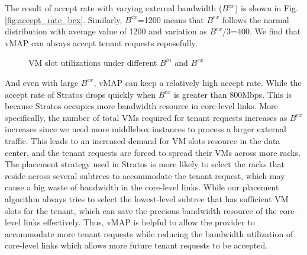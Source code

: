 \documentclass[review]{elsarticle}
\begin{document}
The result of accept rate with varying external bandwidth ($B^{ex}$) is shown in Fig. \ref{fig:accept_rate_bex}. Similarly, $B^{ex}$=1200 means that $B^{ex}$ follows the normal distribution with average value of 1200 and variation as $B^{ex}$/3=400. We find that vMAP can always accept tenant requests reposefully.
\begin{figure}[H]
	\centering
	
	\caption{VM slot utilizations under different $B^{in}$ and $B^{ex}$}
	\label{fig:vm_util}
\end{figure}
 And even with large $B^{ex}$, vMAP can keep a relatively high accept rate. While the accept rate of Stratos drops quickly when $B^{ex}$ is greater than 800Mbps. This is because Stratos occupies more bandwidth resource in core-level links. More specifically, the number of total VMs required for tenant requests increases as $B^{ex}$ increases since we need more middlebox instances to process a larger external traffic. This leads to an increased demand for VM slots resource in the data center, and the tenant requests are forced to spread their VMs across more racks. The placement strategy used in Stratos is more likely to select the racks that reside across several subtrees to accommodate the tenant request, which may cause a big waste of bandwidth in the core-level links. While our placement algorithm always tries to select the lowest-level subtree that has sufficient VM slots for the tenant, which can save the precious bandwidth resource of the core-level links effectively. Thus, vMAP is helpful to allow the provider to accommodate more tenant requests while reducing the bandwidth utilization of core-level links which allows more future tenant requests to be accepted.
\end{document}
